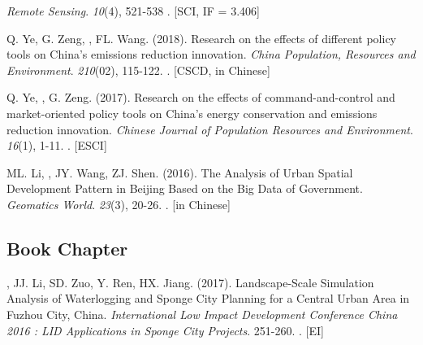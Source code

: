\begin{etaremune}
    \textit{Remote Sensing}. \textit{10}(4), 521-538
    . [SCI, IF = 3.406]
\item
    Q. Ye, G. Zeng, \Shaoqing, FL. Wang. (2018).
	Research on the effects of different policy tools on China’s emissions reduction innovation.
    \textit{China Population, Resources and Environment}. \textit{210}(02), 115-122.
    . [CSCD, in Chinese]
\item
    Q. Ye, \Shaoqing, G. Zeng. (2017).
	Research on the effects of command-and-control and market-oriented policy tools on China’s energy conservation and emissions reduction innovation.
    \textit{Chinese Journal of Population Resources and Environment}. \textit{16}(1), 1-11.
    . [ESCI]
\item
    ML. Li, \Shaoqing, JY. Wang, ZJ. Shen. (2016).
	The Analysis of Urban Spatial Development Pattern in Beijing Based on the Big Data of Government.
    \textit{Geomatics World}. \textit{23}(3), 20-26.
    . [in Chinese]
\end{etaremune}

\subsection*{Book Chapter}
\begin{etaremune}
\item
    \Shaoqing, JJ. Li, SD. Zuo, Y. Ren, HX. Jiang. (2017).
	Landscape-Scale Simulation Analysis of Waterlogging and Sponge City Planning for a Central Urban Area in Fuzhou City, China.
    \textit{International Low Impact Development Conference China 2016 : LID Applications in Sponge City Projects}. 251-260.
    . [EI]
\end{etaremune}

